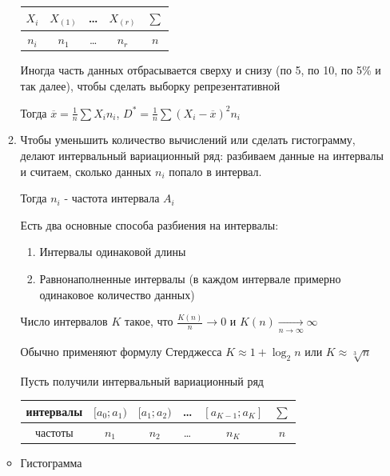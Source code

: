 \begin{enumerate}
\begin{enumerate}
        \begin{tabular}{c|c|c|c|c}
            $X_i$ & $X_{(1)}$ & \dots & $X_{(r)}$ & $\sum$ \\ 
            \hline
            $n_i$ & $n_1$ & \dots & $n_r$ & $n$ \\ 
        \end{tabular}

        Иногда часть данных отбрасывается сверху и снизу (по 5, по 10, по 5\% и так далее), чтобы сделать выборку репрезентативной

        Тогда $\overline{x} = \frac{1}{n} \sum X_i n_i$, $D^* = \frac{1}{n} \sum (X_i - \overline{x})^2 n_i$
        
        \item Чтобы уменьшить количество вычислений или сделать гистограмму, делают интервальный вариационный ряд: 
        разбиваем данные на интервалы и считаем, сколько данных $n_i$ попало в интервал. 

        Тогда $n_i$ - частота интервала $A_i$

        Есть два основные способа разбиения на интервалы: 

        \begin{enumerate}
            \item Интервалы одинаковой длины
            \item Равнонаполненные интервалы (в каждом интервале примерно одинаковое количество данных)
        \end{enumerate}

        Число интервалов $K$ такое, что $\frac{K(n)}{n} \longrightarrow 0$ и $K(n) \underset{n \to \infty}{\longrightarrow} \infty$

        Обычно применяют формулу Стерджесса $K \approx 1 + \log_2 n$ или $K \approx \sqrt[3]{n}$

        Пусть получили интервальный вариационный ряд

        \begin{tabular}{c|c|c|c|c|c}
            интервалы & $[a_0; a_1)$ & $[a_1; a_2)$ & \dots & $[a_{K - 1}; a_K]$ & $\sum$ \\ 
            \hline
            частоты & $n_1$ & $n_2$ & \dots & $n_K$ & $n$ \\ 
        \end{tabular}
    \end{enumerate}

    \smallvspace
        
    \begin{multicols}{2}
        \begin{itemize}
            \item Гистограмма


\end{itemize}
\end{multicols}
\end{enumerate}
